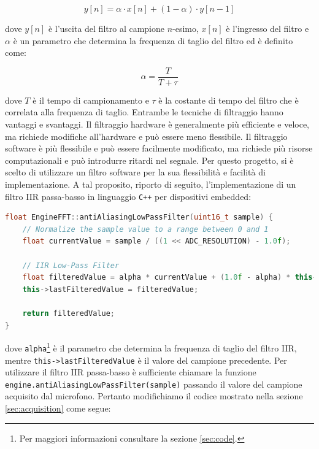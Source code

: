\documentclass[a4paper,12pt]{report}  %
\newcommand{\lstinlinebg}[1]{\colorbox{backcolour}{\lstinline|#1|}}
\begin{document}
\begin{equation}
    y[n] = \alpha \cdot x[n] + (1 - \alpha) \cdot y[n - 1] \nonumber
\end{equation}

dove $y[n]$ è l'uscita del filtro al campione $n$-esimo, $x[n]$ è l'ingresso del filtro e $\alpha$ è un parametro che determina la frequenza di taglio del filtro ed è definito come:

\begin{equation}
    \alpha = \frac{T}{T + \tau} \nonumber
\end{equation}

dove $T$ è il tempo di campionamento e $\tau$ è la costante di tempo del filtro che è correlata alla frequenza di taglio.
Entrambe le tecniche di filtraggio hanno vantaggi e svantaggi.
Il filtraggio hardware è generalmente più efficiente e veloce, ma richiede modifiche all'hardware e può essere meno flessibile.
Il filtraggio software è più flessibile e può essere facilmente modificato, ma richiede più risorse computazionali e può introdurre ritardi nel segnale.
Per questo progetto, si è scelto di utilizzare un filtro software per la sua flessibilità e facilità di implementazione.
A tal proposito, riporto di seguito, l'implementazione di un filtro IIR passa-basso in linguaggio \lstinlinebg{C++} per dispositivi embedded:

\begin{lstlisting}[language=C++,keywords={const, uint8_t, float, this, return, uint16_t, analogRead, println, delay}]
float EngineFFT::antiAliasingLowPassFilter(uint16_t sample) {
    // Normalize the sample value to a range between 0 and 1
    float currentValue = sample / ((1 << ADC_RESOLUTION) - 1.0f);
    
    // IIR Low-Pass Filter
    float filteredValue = alpha * currentValue + (1.0f - alpha) * this->lastFilteredValue;
    this->lastFilteredValue = filteredValue;
    
    return filteredValue;
}
\end{lstlisting}

dove \lstinlinebg{alpha}\footnote{Per maggiori informazioni consultare la sezione \ref{sec:code}.} è il parametro che determina la frequenza di taglio del filtro IIR, mentre \lstinlinebg{this->lastFilteredValue} è il valore del campione precedente.
Per utilizzare il filtro IIR passa-basso è sufficiente chiamare la funzione \lstinlinebg{engine.antiAliasingLowPassFilter(sample)} passando il valore del campione acquisito dal microfono.
Pertanto modifichiamo il codice mostrato nella sezione \ref{sec:acquisition} come segue:
\end{document}
